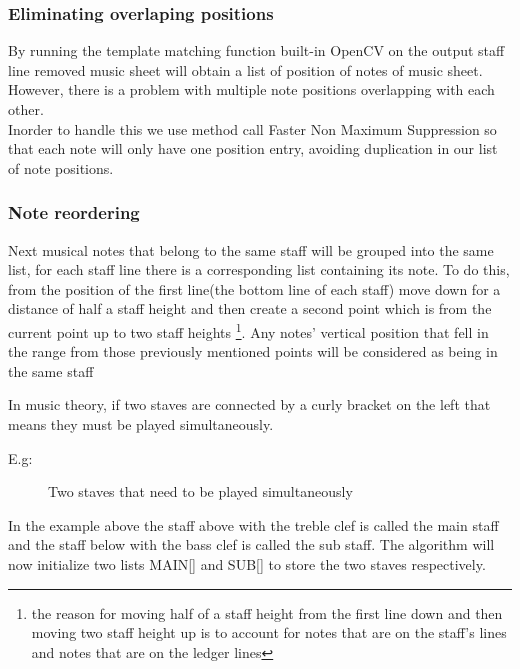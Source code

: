 \documentclass[a4paper,12pt]{report}
\begin{document}
\subsubsection{Eliminating overlaping positions}
By running the template matching function built-in OpenCV on the output staff
line removed music sheet will obtain a list of position of notes of music sheet.
However, there is a problem with multiple note positions overlapping with each
other.\\

Inorder to handle this we use  \textcite{Rosebrock} method call Faster Non
Maximum Suppression so that each note will only have one position entry, avoiding
duplication in our list of note positions.\\

\subsubsection{Note reordering} 

Next musical notes that belong to the same staff
will be grouped into the same list,  for each staff line there is a
corresponding list containing its note.  To do this, from the position of the
first line(the bottom line of each staff) move down for a distance of half a
staff height and then create a second point which is from the current point up
to two staff heights \footnote{the reason for moving half of a staff height from
the first line down and then moving two staff height up  is to account for notes
that are on the staff's lines and notes that are on the ledger lines}. Any notes'
vertical position that fell in the range from those previously mentioned points
will be considered as being in the same staff \\

\clearpage

In music theory, if two staves are connected by a curly bracket on the left
that means they must be played simultaneously.

E.g:\\ 
\begin{figure}[h]
\caption{Two staves that need to be played simultaneously}
\label{fig:two staves}
\end{figure}


In the example above the staff above with the treble clef is called the main
staff and the staff below with the bass clef is called the sub staff. The
algorithm will now initialize two lists MAIN[] and SUB[] to store the two staves
respectively.\\
\end{document}
